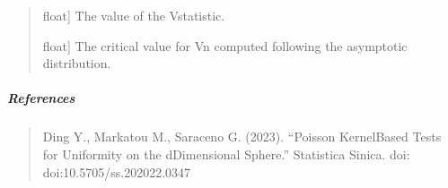 \documentclass[letterpaper,10pt,english,openany,oneside]{sphinxmanual}
\begin{document}
{{{{\begin{fulllineitems}
\begin{quote}
\begin{description}
\sphinxlineitem{v\_statistic\_vn\_}{[}float{]}
\sphinxAtStartPar
The value of the V\sphinxhyphen{}statistic.

\sphinxlineitem{v\_statistic\_cv\_}{[}float{]}
\sphinxAtStartPar
The critical value for Vn computed following the asymptotic distribution.

\end{description}
\end{quote}


\subparagraph{References}
\label{\detokenize{api_reference/generated/QuadratiK.poisson_kernel_test.PoissonKernelTest:references}}\begin{quote}

\sphinxAtStartPar
Ding Y., Markatou M., Saraceno G. (2023). “Poisson Kernel\sphinxhyphen{}Based Tests for
Uniformity on the d\sphinxhyphen{}Dimensional Sphere.” Statistica Sinica. doi: doi:10.5705/ss.202022.0347
\end{quote}



\end{fulllineitems}}}}}
\end{document}

